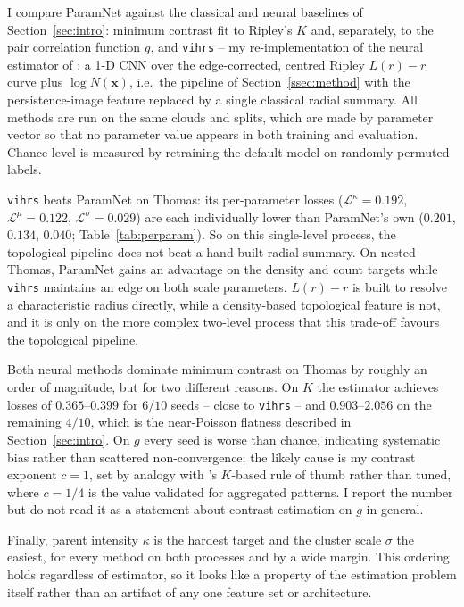 \documentclass[11pt,a4paper]{article}
\newcommand{\pc}{\mathbf{x}}
\begin{document}
I compare ParamNet against the classical and neural baselines of
Section~\ref{sec:intro}: minimum contrast fit to Ripley's $K$ and, separately,
to the pair correlation function $g$, and \texttt{vihrs} -- my re-implementation
of the neural estimator of \citet{vihrs2022neural}: a 1-D CNN over the
edge-corrected, centred Ripley $L(r)-r$ curve plus $\log N(\pc)$, i.e.\ the
pipeline of Section~\ref{ssec:method} with the persistence-image feature
replaced by a single classical radial summary. All methods are run on the same
clouds and splits, which are made by parameter vector so that no parameter value
appears in both training and evaluation. Chance level is measured by retraining
the default model on randomly permuted labels.

\texttt{vihrs} beats ParamNet on Thomas: its per-parameter losses
($\mathcal{L}^\kappa=0.192$, $\mathcal{L}^\mu=0.122$,
$\mathcal{L}^\sigma=0.029$) are each individually lower than ParamNet's own
($0.201$, $0.134$, $0.040$; Table~\ref{tab:perparam}). So on this single-level
process, the topological pipeline does not beat a hand-built radial summary. On
nested Thomas, ParamNet gains an advantage on the density and count targets
while \texttt{vihrs} maintains an edge on both scale parameters. $L(r)-r$ is
built to resolve a characteristic radius directly, while a density-based
topological feature is not, and it is only on the more complex two-level process
that this trade-off favours the topological pipeline.

Both neural methods dominate minimum contrast on Thomas by roughly an order of
magnitude, but for two different reasons. On $K$ the estimator achieves losses
of $0.365$--$0.399$ for $6/10$ seeds -- close to \texttt{vihrs} -- and
$0.903$--$2.056$ on the remaining $4/10$, which is the near-Poisson flatness
described in Section~\ref{sec:intro}. On $g$ every seed is worse than chance,
indicating systematic bias rather than scattered non-convergence; the likely
cause is my contrast exponent $c=1$, set by analogy with
\citet{diggle2003spatial}'s $K$-based rule of thumb rather than tuned, where
$c=1/4$ is the value validated for aggregated patterns. I report the number but
do not read it as a statement about contrast estimation on $g$ in general.

Finally, parent intensity $\kappa$ is the hardest target and the cluster scale
$\sigma$ the easiest, for every method on both processes and by a wide margin.
This ordering holds regardless of estimator, so it looks like a property of the
estimation problem itself rather than an artifact of any one feature set or
architecture.
\end{document}
